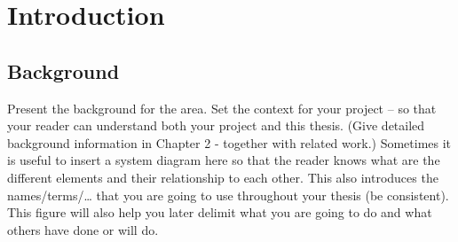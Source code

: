 \chapter{Introduction} \label{ch:introduction}

% 
% 
% 




\section{Background}
\label{sec:background}
Present the background for the area. Set the context for your project – so that your reader can understand both your project and this thesis. (Give detailed background information in Chapter 2 - together with related work.)
Sometimes it is useful to insert a system diagram here so that the reader
knows what are the different elements and their relationship to each
other. This also introduces the names/terms/… that you are going to use
throughout your thesis (be consistent). This figure will also help you later
delimit what you are going to do and what others have done or will do.

